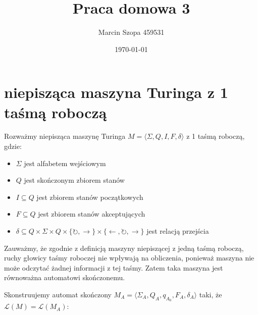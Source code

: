\documentclass{article}
\title{Praca domowa 3}
\author{Marcin Szopa 459531}
\date{\today}
\theoremstyle{definition}
\theoremstyle{remark}
\begin{document}
\maketitle

\section{niepisząca maszyna Turinga z 1 taśmą roboczą}

Rozważmy niepisząca maszynę Turinga $M = \langle \Sigma, Q, I, F, \delta \rangle$ z 1 taśmą roboczą, gdzie:
\begin{itemize}
\item $\Sigma$ jest alfabetem wejściowym
\item $Q$ jest skończonym zbiorem stanów
\item $I \subseteq Q$ jest zbiorem stanów początkowych
\item $F \subseteq Q$ jest zbiorem stanów akceptujących
\item $\delta \subseteq Q \times \Sigma \times Q \times \{\circlearrowright, \rightarrow\} \times \{\leftarrow, \circlearrowright, \rightarrow\}$ jest relacją przejścia
\end{itemize}

Zauważmy, że zgodnie z definicją maszyny niepiszącej z jedną taśmą roboczą, ruchy głowicy taśmy roboczej nie wpływają na obliczenia, ponieważ maszyna nie może odczytać żadnej informacji z tej taśmy. Zatem taka maszyna jest równoważna automatowi skończonemu.

Skonstruujemy automat skończony $M_A = \langle \Sigma_A, Q_A, q_{A_0}, F_A, \delta_A \rangle$ taki, że $\mathcal{L}(M) = \mathcal{L}(M_A)$:
\end{document}
